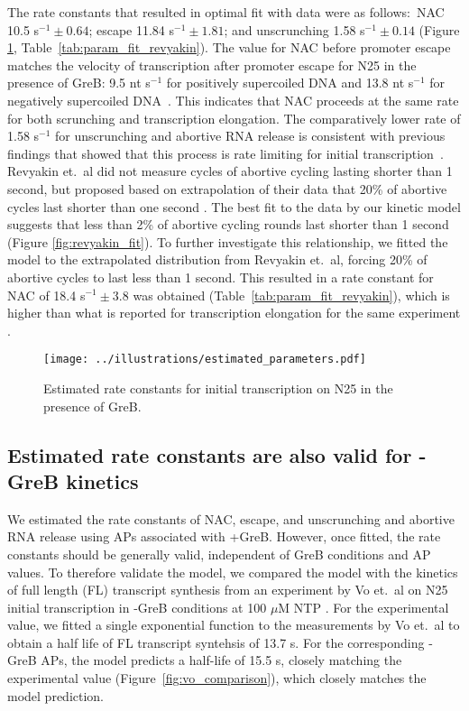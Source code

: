 The rate constants that resulted in optimal fit with data were as follows:~NAC
10.5 s$^{-1} \pm 0.64$; escape 11.84 s$^{-1} \pm 1.81$; and unscrunching 1.58
s$^{-1} \pm 0.14$ (Figure \ref{fig:estimated_parameters},
Table~\ref{tab:param_fit_revyakin}). The value for NAC before promoter escape
matches the velocity of transcription after promoter escape for N25 in the
presence of GreB: 9.5 nt s$^{-1}$ for positively supercoiled DNA and 13.8 nt
s$^{-1}$ for negatively supercoiled DNA~\cite{revyakin_abortive_2006}. This
indicates that NAC proceeds at the same rate for both scrunching and
transcription elongation. The comparatively lower rate of 1.58 s$^{-1}$ for
unscrunching and abortive RNA release is consistent with previous findings
that showed that this process is rate limiting for initial
transcription~\cite{margeat_direct_2006, revyakin_abortive_2006}. Revyakin
et.\ al did not measure cycles of abortive cycling lasting shorter than 1
second, but proposed based on extrapolation of their data that 20\% of
abortive cycles last shorter than one second \cite{revyakin_abortive_2006}.
The best fit to the data by our kinetic model suggests that less than 2\% of
abortive cycling rounds last shorter than 1 second (Figure
\ref{fig:revyakin_fit}). To further investigate this relationship, we fitted
the model to the extrapolated distribution from Revyakin et.\ al, forcing 20\%
of abortive cycles to last less than 1 second.  This resulted in a rate
constant for NAC of 18.4 s$^{-1} \pm 3.8$ was obtained
(Table~\ref{tab:param_fit_revyakin}), which is higher than what is reported
for transcription elongation for the same experiment
\cite{revyakin_abortive_2006}.

\begin{figure}
	\begin{center}
      \texttt{[image: ../illustrations/estimated\_parameters.pdf]}
	\end{center}
    \caption{Estimated rate constants for initial transcription on N25 in the
      presence of GreB.}
    \label{fig:estimated_parameters}
\end{figure}

\subsection{Estimated rate constants are also valid for -GreB kinetics}
We estimated the rate constants of NAC, escape, and unscrunching and abortive
RNA release using APs associated with +GreB. However, once fitted, the rate
constants should be generally valid, independent of GreB conditions and AP
values. To therefore validate the model, we compared the model with the
kinetics of full length (FL) transcript synthesis from an experiment by Vo
et.\ al on N25 initial transcription in -GreB conditions at 100 $\mu$M NTP
\cite{vo_vitro_2003-1}. For the experimental value, we fitted a single
exponential function to the measurements by Vo et.\ al to obtain a half life
of FL transcript syntehsis of 13.7 s. For the corresponding -GreB APs, the
model predicts a half-life of 15.5 s, closely matching the experimental value
(Figure~\ref{fig:vo_comparison}), which closely matches the model prediction.

